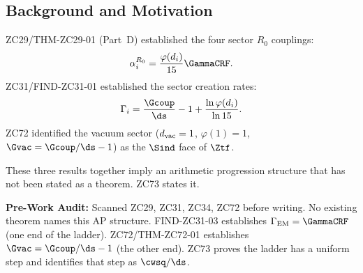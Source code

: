 \documentclass[12pt, a4paper]{article}
\begin{document}
\begin{abstract}
\sloppy
The four CRF sector creation rates $\Gamma_i$ (FIND-ZC31-01, ZC31)
have a hidden structure that becomes visible when the vacuum sector
is included (ZC72/THM-ZC72-01).

\textbf{FIND-ZC73-02} (Geometric-Arithmetic Duality):
The totient values $\varphi(d_i) \in \{1,2,4,8\}$ form a
\emph{geometric} sequence with ratio~2,
while the corresponding $\Gamma_i$ form an
\emph{arithmetic} sequence --- the logarithm converts one to the other.

\textbf{THM-ZC73-01} ($\Gamma$-Sector Ladder Theorem, Exact at $R_0$):
\[
  \Gamma_k \;=\; \frac{\Gcoup}{\ds} - 1 + k\cdot\Gdelta,
  \qquad k = 0,1,2,3,
  \qquad \Gdelta := \frac{\ln 2}{\ln 15} = \frac{\cwsq}{\ds},
\]
where $k = \log_2(\varphi(d_i))$ and the sectors are Vacuum ($k=0$),
Strong ($k=1$), Weak ($k=2$), EM ($k=3$).

\textbf{COR-ZC73-01} (Weinberg--Vacuum Identity):
\[
  \GammaCRF - \Gvac \;=\; \cwsq,
\]
an exact identity connecting the EM sector rate (top of the ladder)
to the vacuum sector rate (floor) via the electroweak mixing angle.

\textbf{FIND-ZC73-03} (Totient Sum Identity):
$\sum_{d_i \mid 15} \varphi(d_i) = 1+2+4+8 = 15 = |\Ztf|$,
the classical totient-sum theorem stated in CRF sector language.

The physical reading: $\cwsq$ is not merely the weak mixing angle ---
it is the \emph{full span} of the sector coupling ladder from
gravity (vacuum) to light (EM).
\end{abstract}

\tableofcontents
\newpage

\subsection{Background and Motivation}
\label{sec:background}

\begin{keybox}[title={Why ZC73 Needs to Be Written}]
ZC29/THM-ZC29-01 (Part~D) established the four sector $R_0$ couplings:
\[
  \alpha_i^{R_0} = \frac{\varphi(d_i)}{15}\GammaCRF.
\]
ZC31/FIND-ZC31-01 established the sector creation rates:
\[
  \Gamma_i = \frac{\Gcoup}{\ds} - 1 + \frac{\ln\varphi(d_i)}{\ln 15}.
\]
ZC72 identified the vacuum sector ($d_{\rm vac}=1$, $\varphi(1)=1$,
$\Gvac = \Gcoup/\ds - 1$) as the $\Sind$ face of $\Ztf$.

\medskip
These three results together imply an arithmetic progression
structure that has not been stated as a theorem.
ZC73 states it.

\medskip
\textbf{Pre-Work Audit:} Scanned ZC29, ZC31, ZC34, ZC72 before
writing. No existing theorem names this AP structure.
FIND-ZC31-03 establishes $\Gamma_{\rm EM} = \GammaCRF$ (one end of
the ladder). ZC72/THM-ZC72-01 establishes $\Gvac = \Gcoup/\ds - 1$
(the other end). ZC73 proves the ladder has a uniform step and
identifies that step as $\cwsq/\ds$.
\end{keybox}
\end{document}
